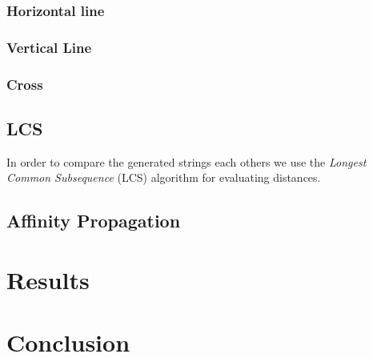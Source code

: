\documentclass[a4paper,12pt]{article}
\begin{document}
\subsubsection{Horizontal line}

\subsubsection{Vertical Line}

\subsubsection{Cross}  
  
\subsection{LCS} 

In order to compare the generated strings each others we use the \emph{Longest Common Subsequence} (LCS) algorithm for evaluating distances.

 
 
\subsection{Affinity Propagation}

\section{Results}

\section{Conclusion} 
\end{document}
